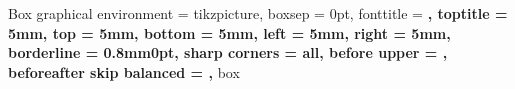 \newcommand{\Mahr}{{*}$\begin{bmatrix}\textrm{atr}\\\textrm{high}\end{bmatrix}$~[rtr]}
\newcommand{\Mbabr}{{*}$\begin{bmatrix}\textrm{atr}\\\textrm{back}\end{bmatrix}$~$\begin{bmatrix}\textrm{rtr}\\\textrm{back}\end{bmatrix}$}


  {Box}
  { 
    graphical environment = tikzpicture,
    boxsep = 0pt,
    fonttitle = \normalsize\sffamily\bfseries,
    toptitle = 5mm,
    top = 5mm,
    bottom = 5mm,
    left = 5mm,
    right = 5mm,
    borderline = {0.8mm}{0pt}{\lsSeriesColor},
    sharp corners = all,
    before upper = {\hspace*{-\parindent}},
    beforeafter skip balanced = \baselineskip,
  }
  {box}
  
